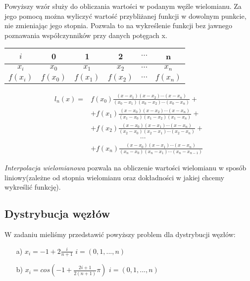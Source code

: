\documentclass{article}
\begin{document}
  Powyższy wzór służy do obliczania wartości w podanym węźle wielomianu. Za jego pomocą można wyliczyć wartość przybliżanej funkcji w dowolnym punkcie, nie zmieniając jego stopnia. Pozwala to na wykreślenie funkcji bez jawnego poznawania współczynników przy danych potęgach x.
  \begin{table}[h]
    \centering
    \begin{tabular}{|c|c|c|c|c|c|}
        \hline
        $i$ & 0 & 1 & 2 & $\cdots$ & n \\
        \hline
        $x_i$ & $x_0$ & $x_1$ & $x_2$ & $\cdots$ & $x_n$ \\
        \hline
        $f(x_i)$ & $f(x_0)$ & $f(x_1)$ & $f(x_2)$ & $\cdots$ & $f(x_n)$ \\
        \hline
    \end{tabular}
\end{table}

\begin{center}
  \begin{align*}
      l_n(x) = & f(x_0) \frac{(x - x_1)(x - x_2)\cdots(x - x_n)}{(x_0 - x_1)(x_0 - x_2)\cdots(x_0 - x_n)} +\\
      & + f(x_1) \frac{(x - x_0)(x - x_2)\cdots(x - x_n)}{(x_1 - x_0)(x_1 - x_2)(x_1 - x_n)} + \\
      & + f(x_2) \frac{(x - x_0)(x - x_1)\cdots(x - x_n)}{(x_2 - x_0)(x_2 - x_1)\cdots(x_2 - x_n)} + \\
      & \hspace{3cm} \cdots \\
      & + f(x_n) \frac{(x - x_0)(x - x_1)\cdots(x - x_n)}{(x_n - x_0)(x_n - x_1)\cdots(x_n - x_{n-1})}
  \end{align*}
\end{center}

  \textit{Interpolacja wielomianowa} pozwala na obliczenie wartości wielomianu w sposób liniowy(zależne od stopnia wielomianu oraz dokładności w jakiej chcemy wykreślić funkcję).

  \subsection{Dystrybucja węzłów}
  W zadaniu mieliśmy przedstawić powyższy problem dla dystrybucji węzłów:
  \begin{enumerate}
    \item[a)] $x_i = -1 + 2\frac{i}{n+1}$ \qquad $i = (0,1, ..., n)$
    \item[b)] $x_i = cos( -1 + \frac{2i+1}{2(n+1)}\pi)$ \qquad $i = (0,1, ..., n)$
  \end{enumerate}
\end{document}
